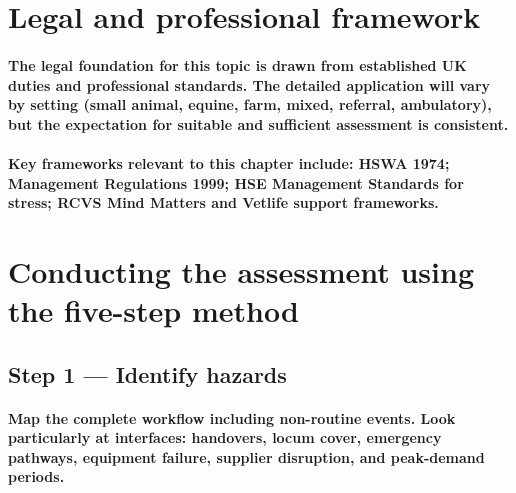 \section{Legal and professional framework}

\paragraph{The legal foundation for this topic is drawn from established UK duties and professional standards. The detailed application will vary by setting (small animal, equine, farm, mixed, referral, ambulatory), but the expectation for suitable and sufficient assessment is consistent.}

\paragraph{Key frameworks relevant to this chapter include: HSWA 1974; Management Regulations 1999; HSE Management Standards for stress; RCVS Mind Matters and Vetlife support frameworks.}

\begin{itemize}
\end{itemize}

\section{Conducting the assessment using the five-step method}

\subsection{Step 1 — Identify hazards}
\paragraph{Map the complete workflow including non-routine events. Look particularly at interfaces: handovers, locum cover, emergency pathways, equipment failure, supplier disruption, and peak-demand periods.}

